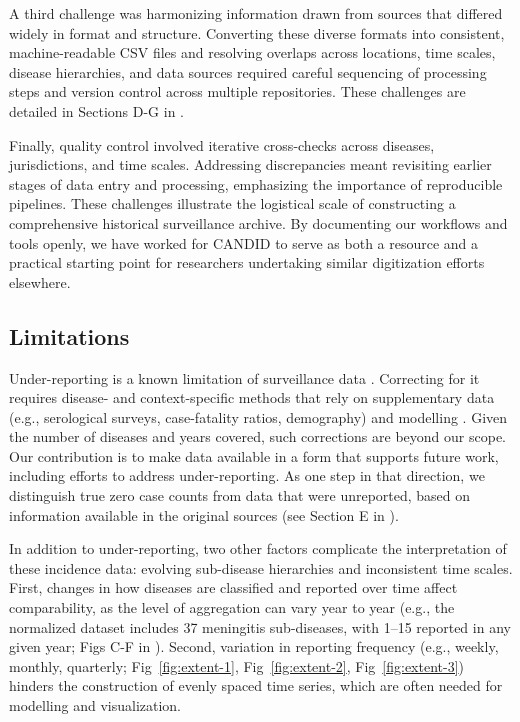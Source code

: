 \documentclass[10pt,letterpaper]{article}
\begin{document}
A third challenge was harmonizing information drawn from sources that differed widely in format and structure. Converting these diverse formats into consistent, machine-readable CSV files and resolving overlaps across locations, time scales, disease hierarchies, and data sources required careful sequencing of processing steps and version control across multiple repositories. These challenges are detailed in Sections D-G in .

Finally, quality control involved iterative cross-checks across diseases, jurisdictions, and time scales. Addressing discrepancies meant revisiting earlier stages of data entry and processing, emphasizing the importance of reproducible pipelines. These challenges illustrate the logistical scale of constructing a comprehensive historical surveillance archive. By documenting our workflows and tools openly, we have worked for CANDID to serve as both a resource and a practical starting point for researchers undertaking similar digitization efforts elsewhere.

\subsection*{Limitations}\label{sec:limitations}

Under-reporting is a known limitation of surveillance data \cite{van2013contagious,keramarou2012completeness}. Correcting for it requires disease- and context-specific methods that rely on supplementary data (e.g., serological surveys, case-fatality ratios, demography) and modelling \cite{gibbons2014measuring}. Given the number of diseases and years covered, such corrections are beyond our scope. Our contribution is to make data available in a form that supports future work, including efforts to address under-reporting. As one step in that direction, we distinguish true zero case counts from data that were unreported, based on information available in the original sources (see Section E in ).

In addition to under-reporting, two other factors complicate the interpretation of these incidence data: evolving sub-disease hierarchies and inconsistent time scales. First, changes in how diseases are classified and reported over time affect comparability, as the level of aggregation can vary year to year (e.g., the normalized dataset includes 37 meningitis sub-diseases, with 1--15 reported in any given year; Figs C-F in ). Second, variation in reporting frequency (e.g., weekly, monthly, quarterly; Fig~\ref{fig:extent-1}, Fig~\ref{fig:extent-2}, Fig~\ref{fig:extent-3}) hinders the construction of evenly spaced time series, which are often needed for modelling and visualization.
\end{document}
